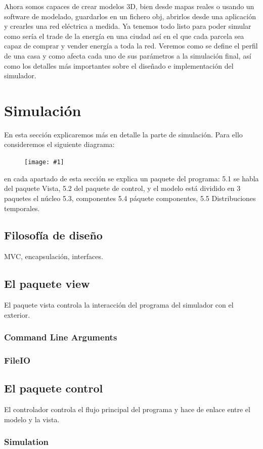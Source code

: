 \documentclass[12pt,a4paper,openright,oneside]{article}
\newcommand{\includeImage}[1]
{
	\begin{figure}[htb]
	\begin{center}
	\texttt{[image: \#1]}
	\end{center}
	\end{figure}
}
\numberwithin{equation}{section}
\theoremstyle{definition}
\begin{document}
Ahora somos capaces de crear modelos 3D, bien desde mapas reales o usando un software de modelado, guardarlos en un fichero obj, abrirlos desde una aplicación y crearles una red eléctrica a medida. Ya tenemos todo listo para poder simular como sería el trade de la energía en una ciudad así en el que cada parcela sea capaz de comprar y vender energía a toda la red. Veremos como se define el perfil de una casa y como afecta cada uno de sus parámetros a la simulación final, así como los detalles más importantes sobre el diseñado e implementación del simulador.

\newpage




\section{Simulación}
En esta sección explicaremos más en detalle la parte de simulación. Para ello consideremos el siguiente diagrama:
\includeImage{simulator.png}
en cada apartado de esta sección se explica un paquete del programa: 5.1 se habla del paquete Vista, 5.2 del paquete de control, y el modelo está dividido en 3 paquetes el núcleo 5.3, componentes 5.4 páquete componentes, 5.5 Distribuciones temporales.

\subsection{Filosofía de diseño}
MVC, encapsulación, interfaces.
\subsection{El paquete view}
El paquete vista controla la interacción del programa del simulador con el exterior.
\subsubsection{Command Line Arguments}
\subsubsection{FileIO}
\subsection{El paquete control}
El controlador controla el flujo principal del programa y hace de enlace entre el modelo y la vista.
\subsubsection{Simulation}
\end{document}
